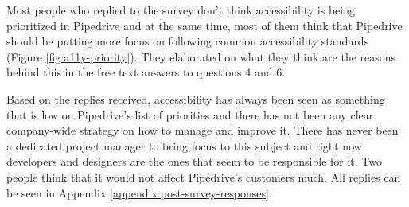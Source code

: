 \documentclass{master_thesis}
\begin{document}
Most people who replied to the survey don't think accessibility is being prioritized in Pipedrive and at the same time, most of them think that Pipedrive should be putting more focus on following common accessibility standards (Figure \ref{fig:a11y-priority}). They elaborated on what they think are the reasons behind this in the free text answers to questions 4 and 6.

Based on the replies received, accessibility has always been seen as something that is low on Pipedrive's list of priorities and there has not been any clear company-wide strategy on how to manage and improve it. There has never been a dedicated project manager to bring focus to this subject and right now developers and designers are the ones that seem to be responsible for it.
Two people think that it would not affect Pipedrive's customers much. All replies can be seen in  Appendix \ref{appendix:post-survey-responses}.
\end{document}
